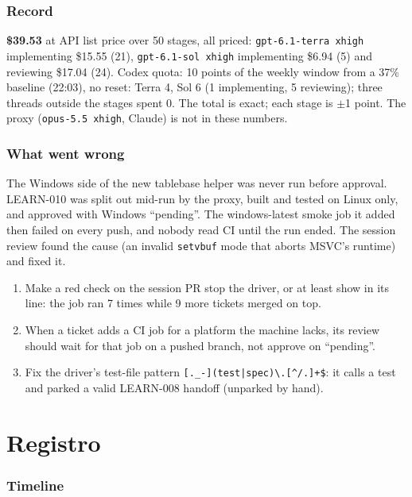 \documentclass[11pt,a4paper]{article}
\begin{document}
\section*{Record}

\textbf{\$39.53} at API list price over 50 stages, all priced: \texttt{gpt-6.1-terra xhigh}
implementing \$15.55 (21), \texttt{gpt-6.1-sol xhigh} implementing \$6.94 (5) and reviewing
\$17.04 (24). Codex quota: 10 points of the weekly window from a 37\% baseline (22:03), no reset:
Terra 4, Sol 6 (1 implementing, 5 reviewing); three threads outside the stages spent 0. The total
is exact; each stage is $\pm$1 point. The proxy (\texttt{opus-5.5 xhigh}, Claude) is not in these numbers.

\section*{What went wrong}

The Windows side of the new tablebase helper was never run before approval. LEARN-010 was split
out mid-run by the proxy, built and tested on Linux only, and approved with Windows ``pending''.
The windows-latest smoke job it added then failed on every push, and nobody read CI until the run ended.
The session review found the cause (an invalid \texttt{setvbuf} mode that aborts MSVC's runtime) and fixed it.

\begin{enumerate}
  \item Make a red check on the session PR stop the driver, or at least show in its line: the
        job ran 7 times while 9 more tickets merged on top.
  \item When a ticket adds a CI job for a platform the machine lacks, its review should wait for
        that job on a pushed branch, not approve on ``pending''.
  \item Fix the driver's test-file pattern \verb![._-](test|spec)\.[^/.]+$!: it calls
         a test and parked a valid LEARN-008 handoff (unparked by hand).
\end{enumerate}

\appendix
\part*{Registro}

\section*{Timeline}
\end{document}
